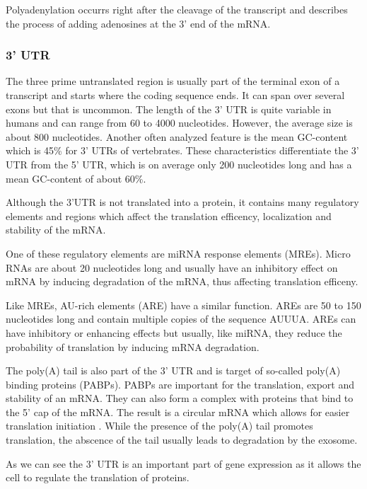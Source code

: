 Polyadenylation occurrs right after the cleavage of the transcript and describes the process of adding adenosines at the 3' end of the mRNA.


\subsubsection{3' UTR}
\label{3_UTR}
The three prime untranslated region is usually part of the terminal exon of a transcript and starts where the coding sequence ends. It can span over several exons but that is uncommon. The length of the 3' UTR is quite variable in humans and can range from 60 to 4000 nucleotides. However, the average size is about 800 nucleotides. Another often analyzed feature is the mean GC-content which is 45\% for 3' UTRs of vertebrates. These characteristics differentiate the 3' UTR from the 5' UTR, which is on average only 200 nucleotides long and has a mean GC-content of about 60\%.

Although the 3'UTR is not translated into a protein, it contains many regulatory elements and regions which affect the translation efficency, localization and stability of the mRNA. 

One of these regulatory elements are miRNA response elements (MREs). Micro RNAs are about 20 nucleotides long and usually have an inhibitory effect on mRNA by inducing degradation of the mRNA, thus affecting translation efficeny. 

Like MREs, AU-rich elements (ARE) have a similar function. AREs are 50 to 150 nucleotides long and contain multiple copies of the sequence AUUUA. AREs can have inhibitory or enhancing effects but usually, like miRNA, they reduce the probability of translation by inducing mRNA degradation.

The poly(A) tail is also part of the 3' UTR and is target of so-called poly(A) binding proteins (PABPs). PABPs are important for the translation, export and stability of an mRNA. They can also form a complex with proteins that bind to the 5' cap of the mRNA. The result is a circular mRNA which allows for easier translation initiation . While the presence of the poly(A) tail promotes translation, the abscence of the tail usually leads to degradation by the exosome. 

As we can see the 3' UTR is an important part of gene expression as it allows the cell to regulate the translation of proteins.


